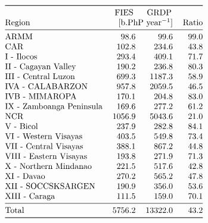 \documentclass[10pt]{article}
\begin{document}
\[\begin{tabular}{@{}lrrr@{}}
\toprule
{} & \multicolumn{1}{@{}c@{}}{FIES} & \multicolumn{1}{@{}c@{}}{GRDP} & \\
Region                   & \multicolumn{2}{r}{[b.PhP year$^{-1}$]} & Ratio \\
\midrule
ARMM                     &    98.6 &     99.6 &   99.0 \\
CAR                      &   102.8 &    234.6 &   43.8 \\
I - Ilocos               &   293.4 &    409.1 &   71.7 \\
II - Cagayan Valley      &   190.2 &    236.8 &   80.3 \\
III - Central Luzon      &   699.3 &   1187.3 &   58.9 \\
IVA - CALABARZON         &   957.8 &   2059.5 &   46.5 \\
IVB - MIMAROPA           &   170.1 &    204.8 &   83.0 \\
IX - Zamboanga Peninsula &   169.6 &    277.2 &   61.2 \\
NCR                      &  1056.9 &   5043.6 &   21.0 \\
V - Bicol                &   237.9 &    282.8 &   84.1 \\
VI - Western Visayas     &   403.5 &    549.8 &   73.4 \\
VII - Central Visayas    &   388.1 &    867.2 &   44.8 \\
VIII - Eastern Visayas   &   193.8 &    271.9 &   71.3 \\
X - Northern Mindanao    &   221.5 &    517.6 &   42.8 \\
XI - Davao               &   270.2 &    565.2 &   47.8 \\
XII - SOCCSKSARGEN       &   190.9 &    356.0 &   53.6 \\
XIII - Caraga            &   111.5 &    159.0 &   70.1 \\
\midrule
Total                    &  5756.2 &  13322.0 &   43.2 \\
\bottomrule
\end{tabular}\]
\end{document}
